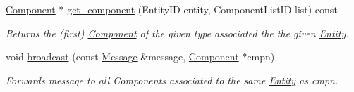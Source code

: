 \begin{DoxyCompactItemize}
\hyperlink{classnta_1_1Component}{Component} $\ast$ \hyperlink{classnta_1_1ECS_a0a5e6e7ee700a11a048bfaec497f4df4}{get\+\_\+component} (Entity\+ID entity, Component\+List\+ID list) const
\begin{DoxyCompactList}\small\item\em Returns the (first) \hyperlink{classnta_1_1Component}{Component} of the given type associated the the given \hyperlink{classnta_1_1Entity}{Entity}. \end{DoxyCompactList}\item 
\mbox{\label{classnta_1_1ECS_a997e9fa8509387cdb0f08680b019eb64}} 
void \hyperlink{classnta_1_1ECS_a997e9fa8509387cdb0f08680b019eb64}{broadcast} (const \hyperlink{structnta_1_1Message}{Message} \&message, \hyperlink{classnta_1_1Component}{Component} $\ast$cmpn)
\begin{DoxyCompactList}\small\item\em Forwards message to all Components associated to the same \hyperlink{classnta_1_1Entity}{Entity} as cmpn. \end{DoxyCompactList}\end{DoxyCompactItemize}
